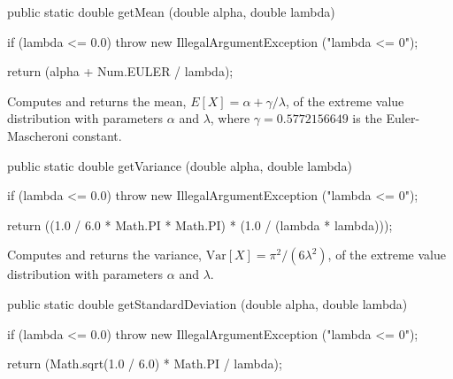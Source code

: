 \begin{htmlonly}
\end{htmlonly}
\begin{code}

   public static double getMean (double alpha, double lambda)\begin{hide} {
     if (lambda <= 0.0)
         throw new IllegalArgumentException ("lambda <= 0");

      return (alpha + Num.EULER / lambda);
   }\end{hide}
\end{code}
\begin{tabb}  Computes and returns the mean,  $E[X] = \alpha + \gamma/\lambda$,
   of the extreme value distribution with parameters $\alpha$ and $\lambda$,
  where $\gamma = 0.5772156649$ is the Euler-Mascheroni constant.
\end{tabb}
\begin{htmlonly}
\end{htmlonly}
\begin{code}

   public static double getVariance (double alpha, double lambda)\begin{hide} {
     if (lambda <= 0.0)
         throw new IllegalArgumentException ("lambda <= 0");

      return ((1.0 / 6.0 * Math.PI * Math.PI) * (1.0 / (lambda * lambda)));
   }\end{hide}
\end{code}
\begin{tabb}  Computes and returns the variance, $\mbox{Var}[X] =
  \pi^2/(6\lambda^2)$,
   of the extreme value distribution with parameters $\alpha$ and $\lambda$.
\end{tabb}
\begin{htmlonly}
\end{htmlonly}
\begin{code}

   public static double getStandardDeviation (double alpha, double lambda)\begin{hide} {
     if (lambda <= 0.0)
         throw new IllegalArgumentException ("lambda <= 0");

      return (Math.sqrt(1.0 / 6.0) * Math.PI / lambda);
   }\end{hide}
\end{code}
